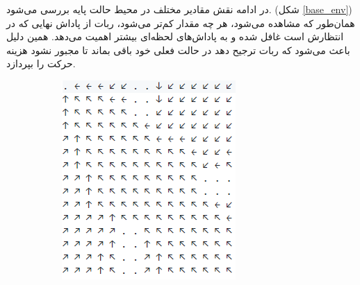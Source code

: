 \documentclass[12pt, a4paper]{article}
\begin{document}
در ادامه نقش مقادیر مختلف  در محیط حالت پایه بررسی می‌شود.
(شکل \ref{base_env}) همان‌طور که مشاهده می‌شود، هر چه مقدار  کم‌تر می‌شود،
ربات از پاداش نهایی که در انتظارش است غافل شده و به پاداش‌های لحظه‌ای بیشتر اهمیت می‌دهد.
همین دلیل باعث می‌شود که ربات ترجیح دهد در حالت فعلی خود باقی بماند تا مجبور نشود هزینه
حرکت را بپردازد.

\begin{figure}[h]
    \begin{subfigure}{0.45\linewidth}
        \centering
        \includegraphics[width=\linewidth]{images/q4/d/base/discount_09.png}
        \caption{}
    \end{subfigure}
    \hfill
    \begin{subfigure}{0.45\linewidth}
        \centering

\end{subfigure}
\end{figure}
\end{document}
